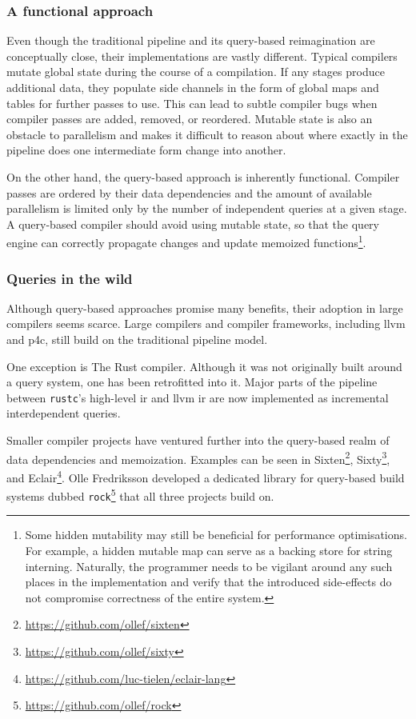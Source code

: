 \subsubsection*{A functional approach}

Even though the traditional pipeline and its query-based reimagination are
conceptually close, their implementations are vastly different. Typical
compilers mutate global state during the course of a compilation. If any stages
produce additional data, they populate side channels in the form of global maps
and tables for further passes to use. This can lead to subtle compiler bugs when
compiler passes are added, removed, or reordered. Mutable state is also an
obstacle to parallelism and makes it difficult to reason about where exactly in
the pipeline does one intermediate form change into another.

On the other hand, the query-based approach is inherently functional. Compiler
passes are ordered by their data dependencies and the amount of available
parallelism is limited only by the number of independent queries at a given
stage. A query-based compiler should avoid using mutable state, so that the
query engine can correctly propagate changes and update memoized
functions\footnote{Some hidden mutability may still be beneficial for
performance optimisations. For example, a hidden mutable map can serve as a
backing store for string interning. Naturally, the programmer needs to be
vigilant around any such places in the implementation and verify that the
introduced side-effects do not compromise correctness of the entire system.}.

\subsubsection*{Queries in the wild}

Although query-based approaches promise many benefits, their adoption in large
compilers seems scarce. Large compilers and compiler frameworks, including
\acrshort{llvm} and p4c, still build on the traditional pipeline model.

One exception is The Rust compiler. Although it was not originally built around
a query system, one has been retrofitted into it. Major parts of the pipeline
between \texttt{rustc}'s high-level \acrshort{ir} and \acrshort{llvm}
\acrshort{ir} are now implemented as incremental interdependent
queries\cite{rustc-queries}.

Smaller compiler projects have ventured further into the query-based realm of
data dependencies and memoization. Examples can be seen in
Sixten\footnote{\url{https://github.com/ollef/sixten}},
Sixty\footnote{\url{https://github.com/ollef/sixty}}, and
Eclair\footnote{\url{https://github.com/luc-tielen/eclair-lang}}. Olle
Fredriksson developed a dedicated library for query-based build systems dubbed
\texttt{rock}\footnote{\url{https://github.com/ollef/rock}} that all three
projects build on.
